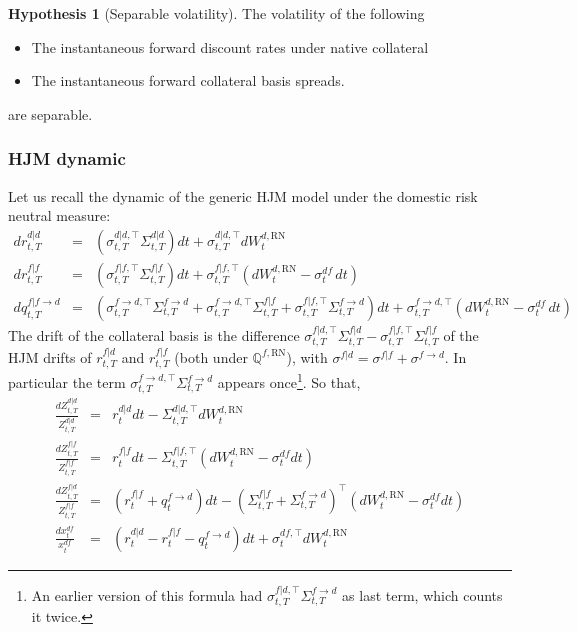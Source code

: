 \documentclass[11pt,english]{amsart}
\newcommand{\RN}{\mathrm{RN}}
\newcommand{\QQ}{\mathbb{Q}}
\theoremstyle{definition}
\newtheorem*{hypo}{Hypothesis}
\begin{document}
\begin{hypo}[Separable volatility]
The volatility of the following 
\begin{itemize} 
\item The instantaneous forward discount rates under native collateral
\item The instantaneous forward collateral basis spreads.
\end{itemize}
are separable.
\end{hypo}


\subsubsection{HJM dynamic}
Let us  recall the dynamic of the generic HJM model under the  domestic risk neutral measure:
\begin{eqnarray}
  dr^{d|d}_{t,T} &=& \left(\sigma^{d|d,\top}_{t,T} \Sigma^{d|d}_{t,T} \right) dt +  \sigma^{d|d,\top}_{t,T} dW^{d,\RN}_t   \\
  dr^{f|f}_{t,T} &=& \left(\sigma^{f|f,\top}_{t,T} \Sigma^{f|f}_{t,T} \right) dt +  \sigma^{f|f,\top}_{t,T} \left(dW^{d,\RN}_t -\sigma^{df}_t \,dt\right)  \\
  dq^{f|f\to d}_{t,T} &=& \left(\sigma^{f\to d,\top}_{t,T} \Sigma^{f\to d}_{t,T} + \sigma^{f\to d,\top}_{t,T} \Sigma^{f|f}_{t,T} + \sigma^{f|f,\top}_{t,T} \Sigma^{f\to d}_{t,T}\right) dt +  \sigma^{f\to d,\top}_{t,T} \left(dW^{d,\RN}_t -\sigma^{df}_t \,dt\right)
\end{eqnarray}
The drift of the collateral basis is the difference $\sigma^{f|d,\top}_{t,T}\Sigma^{f|d}_{t,T} - \sigma^{f|f,\top}_{t,T}\Sigma^{f|f}_{t,T}$ of the HJM drifts of $r^{f|d}_{t,T}$ and $r^{f|f}_{t,T}$ (both under $\QQ^{f,\RN}$), with $\sigma^{f|d} = \sigma^{f|f} + \sigma^{f\to d}$. In particular the term $\sigma^{f\to d,\top}_{t,T}\Sigma^{f\to d}_{t,T}$ appears once\footnote{An earlier version of this formula had $\sigma^{f|d,\top}_{t,T}\Sigma^{f\to d}_{t,T}$ as last term, which counts it twice.}.
So that, 
\begin{eqnarray}
  \frac{dZ^{d|d}_{t,T}}{Z^{d|d}_{t,T}} &=& r^{d|d}_t  dt - \Sigma^{d|d,\top}_{t,T} dW^{d,\RN}_t  \\
  \frac{dZ^{f|f}_{t,T}}{Z^{f|f}_{t,T}} 
  &=& r^{f|f}_t  dt - \Sigma^{f|f,\top}_{t,T} \left( dW^{d,\RN}_t -\sigma^{df}_t dt\right) \\
  \frac{dZ^{f|d}_{t,T}}{Z^{f|f}_{t,T}} 
  &=&  \left(r^{f|f}_t + q^{f\to d}_t \right)  dt 
  - \left(\Sigma^{f|f}_{t,T} + \Sigma^{f\to d}_{t,T}  \right)^\top \left( dW^{d,\RN}_t -\sigma^{df}_t dt\right) \\
     \frac{dx^{df}_{t}}{x^{df}_{t}} &=& \left(r^{d|d}_t - r^{f|f}_t - q^{f\to d}_t \right) dt + \sigma^{df,\top}_{t} dW^{d,\RN}_t  
\end{eqnarray}
\end{document}
